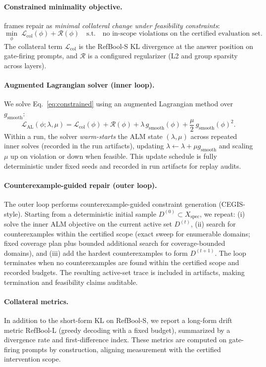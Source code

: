 \paragraph{Constrained minimality objective.}
\Method frames repair as \emph{minimal collateral change under feasibility constraints}:
\begin{equation}
\min_{\phi}\; \mathcal{L}_{\text{col}}(\phi) + \mathcal{R}(\phi)
\quad \text{s.t.}\quad \text{no in-scope violations on the certified evaluation set.}
\label{eq:constrained}
\end{equation}
The collateral term $\mathcal{L}_{\text{col}}$ is the RefBool-S KL divergence at the answer position on gate-firing prompts, and $\mathcal{R}$ is a configured regularizer (L2 and group sparsity across layers).

\paragraph{Augmented Lagrangian solver (inner loop).}
We solve Eq.~\eqref{eq:constrained} using an augmented Lagrangian method over $g_{\text{smooth}}$:
\begin{equation}
\mathcal{L}_{\text{AL}}(\phi;\lambda,\mu) = \mathcal{L}_{\text{col}}(\phi) + \mathcal{R}(\phi)
+ \lambda\,g_{\text{smooth}}(\phi) + \frac{\mu}{2}\,g_{\text{smooth}}(\phi)^2.
\end{equation}
Within a run, the solver \emph{warm-starts} the ALM state $(\lambda,\mu)$ across repeated inner solves (recorded in the run artifacts), updating
$\lambda \leftarrow \lambda + \mu g_{\text{smooth}}$ and scaling $\mu$ up on violation or down when feasible.
This update schedule is fully deterministic under fixed seeds and recorded in run artifacts for replay audits.

\paragraph{Counterexample-guided repair (outer loop).}
The outer loop performs counterexample-guided constraint generation (CEGIS-style).
Starting from a deterministic initial sample $D^{(0)}\subset X_{\text{spec}}$, we repeat:
(i) solve the inner ALM objective on the current active set $D^{(t)}$,
(ii) search for counterexamples within the certified scope (exact sweep for enumerable domains; fixed coverage plan plus bounded additional search for coverage-bounded domains),
and (iii) add the hardest counterexamples to form $D^{(t+1)}$.
The loop terminates when no counterexamples are found within the certified scope and recorded budgets.
The resulting active-set trace is included in artifacts, making termination and feasibility claims auditable.

\paragraph{Collateral metrics.}
In addition to the short-form KL on RefBool-S, we report a long-form drift metric RefBool-L (greedy decoding with a fixed budget), summarized by a divergence rate and first-difference index.
These metrics are computed on gate-firing prompts by construction, aligning measurement with the certified intervention scope.
